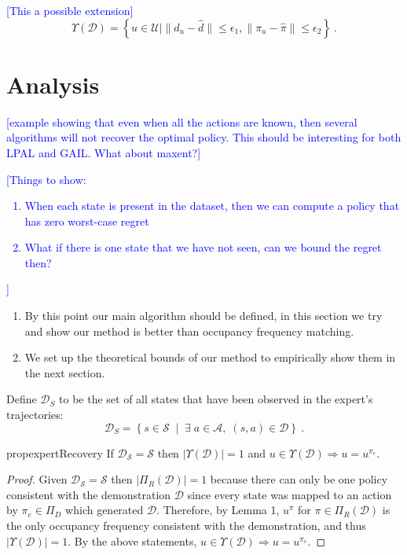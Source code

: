 \documentclass[11pt]{uai2023}
\newcommand{\mm}[1]{\textcolor{blue}{[#1]}}
\begin{document}
\mm{This a possible extension}
\begin{equation}
	\Upsilon(\mathcal{D}) = \left\{ u \in \mathcal{U} \mid  
 \| d_u - \hat{d} \| \le \epsilon_1, 
 \| \pi_u - \hat{\pi} \| \le \epsilon_2
 \right\}~.
\end{equation}


\section{Analysis}
\mm{example showing that even when all the actions are known, then several algorithms will not recover the optimal policy. This should be interesting for both LPAL and GAIL. What about maxent?}


\mm{Things to show:
	\begin{enumerate}
		\item When each state is present in the dataset, then we can compute a policy that has zero worst-case regret
		\item What if there is one state that we have not seen, can we bound the regret then?
	\end{enumerate}
}

\begin{enumerate}
	\item By this point our main algorithm should be defined, in this section we
	      try and show our method is better than occupancy frequency matching.
	\item We set up the theoretical bounds of our method to empirically show them
	      in the next section.
\end{enumerate}

Define $\mathcal{D}_S$ to be the set of all states that have been observed in the expert's trajectories:
\[
	\mathcal{D}_S  = \left\{ s\in \mathcal{S} \; \mid \; \exists\; a\in \mathcal{A}, \; (s,a) \in \mathcal{D} \right\}~.
\]



\begin{restatable}{prop}{expertRecovery}
    \label{expert_recovery}
    If $\mathcal{D}_\mathcal{S} = \mathcal{S}$ then $|\Upsilon(\mathcal{D})| = 1$
    and $u \in \Upsilon(\mathcal{D}) \Rightarrow u = u^{\pi_e}$.
\end{restatable}

\begin{proof}
	Given $\mathcal{D}_\mathcal{S} = \mathcal{S}$ then $|\Pi_R(\mathcal{D})| = 1$
	because there can only be one policy consistent with the demonstration
	$\mathcal{D}$ since every state was mapped to an action by $\pi_e \in \Pi_D$
	which generated $\mathcal{D}$. Therefore, by Lemma 1, $u^\pi$ for $\pi \in
		\Pi_R(\mathcal{D})$ is the only occupancy frequency consistent with the
	demonstration, and thus $|\Upsilon(\mathcal{D})| = 1$. By the above
	statements, $u \in \Upsilon(\mathcal{D}) \Rightarrow u = u^{\pi_e}$.
\end{proof}
\end{document}
